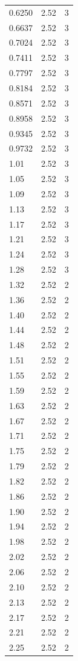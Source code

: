 \begin{longtable}{lrr}
  0.6250 & 2.52 & 3 \\
  0.6637 & 2.52 & 3 \\
  0.7024 & 2.52 & 3 \\
  0.7411 & 2.52 & 3 \\
  0.7797 & 2.52 & 3 \\
  0.8184 & 2.52 & 3 \\
  0.8571 & 2.52 & 3 \\
  0.8958 & 2.52 & 3 \\
  0.9345 & 2.52 & 3 \\
  0.9732 & 2.52 & 3 \\
  1.01 & 2.52 & 3 \\
  1.05 & 2.52 & 3 \\
  1.09 & 2.52 & 3 \\
  1.13 & 2.52 & 3 \\
  1.17 & 2.52 & 3 \\
  1.21 & 2.52 & 3 \\
  1.24 & 2.52 & 3 \\
  1.28 & 2.52 & 3 \\
  1.32 & 2.52 & 2 \\
  1.36 & 2.52 & 2 \\
  1.40 & 2.52 & 2 \\
  1.44 & 2.52 & 2 \\
  1.48 & 2.52 & 2 \\
  1.51 & 2.52 & 2 \\
  1.55 & 2.52 & 2 \\
  1.59 & 2.52 & 2 \\
  1.63 & 2.52 & 2 \\
  1.67 & 2.52 & 2 \\
  1.71 & 2.52 & 2 \\
  1.75 & 2.52 & 2 \\
  1.79 & 2.52 & 2 \\
  1.82 & 2.52 & 2 \\
  1.86 & 2.52 & 2 \\
  1.90 & 2.52 & 2 \\
  1.94 & 2.52 & 2 \\
  1.98 & 2.52 & 2 \\
  2.02 & 2.52 & 2 \\
  2.06 & 2.52 & 2 \\
  2.10 & 2.52 & 2 \\
  2.13 & 2.52 & 2 \\
  2.17 & 2.52 & 2 \\
  2.21 & 2.52 & 2 \\
  2.25 & 2.52 & 2 \\

\end{longtable}
